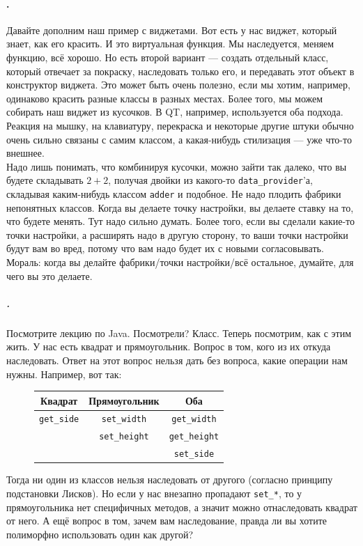 \documentclass{article}
\begin{document}
    \paragraph{.}
    Давайте дополним наш пример с виджетами. Вот есть у нас виджет, который знает, как его красить. И это виртуальная функция. Мы наследуется, меняем функцию, всё хорошо. Но есть второй вариант --- создать отдельный класс, который отвечает за покраску, наследовать только его, и передавать этот объект в конструктор виджета. Это может быть очень полезно, если мы хотим, например, одинаково красить разные классы в разных местах. Более того, мы можем собирать наш виджет из кусочков. В QT, например, используется оба подхода. Реакция на мышку, на клавиатуру, перекраска и некоторые другие штуки обычно очень сильно связаны с самим классом, а какая-нибудь стилизация --- уже что-то внешнее.\\
    Надо лишь понимать, что комбинируя кусочки, можно зайти так далеко, что вы будете складывать $2+2$, получая двойки из какого-то \texttt{data_provider}'а, складывая каким-нибудь классом \texttt{adder} и подобное. Не надо плодить фабрики непонятных классов. Когда вы делаете точку настройки, вы делаете ставку на то, что будете менять. Тут надо сильно думать. Более того, если вы сделали какие-то точки настройки, а расширять надо в другую сторону, то ваши точки настройки будут вам во вред, потому что вам надо будет их с новыми согласовывать.\\
    Мораль: когда вы делайте фабрики/точки настройки/всё остальное, думайте, для чего вы это делаете.
    \subparagraph{.}
    Посмотрите лекцию по Java. Посмотрели? Класс. Теперь посмотрим, как с этим жить. У нас есть квадрат и прямоугольник. Вопрос в том, кого из их откуда наследовать. Ответ на этот вопрос нельзя дать без вопроса, какие операции нам нужны. Например, вот так:
    \begin{figure}[H]
        \begin{tabular}{|c|c|c|}
            \hline
            Квадрат & Прямоугольник & Оба\\
            \hline
            \Verb|get_side| & \Verb|set_width| & \Verb|get_width|\\
            & \Verb|set_height| & \Verb|get_height|\\
            && \Verb|set_side|\\
            \hline
        \end{tabular}
    \end{figure}
    Тогда ни один из классов нельзя наследовать от другого (согласно принципу подстановки Лисков). Но если у нас внезапно пропадают \Verb|set_*|, то у прямоугольника нет специфичных методов, а значит можно отнаследовать квадрат от него. А ещё вопрос в том, зачем вам наследование, правда ли вы хотите полиморфно использовать один как другой?
\end{document}
